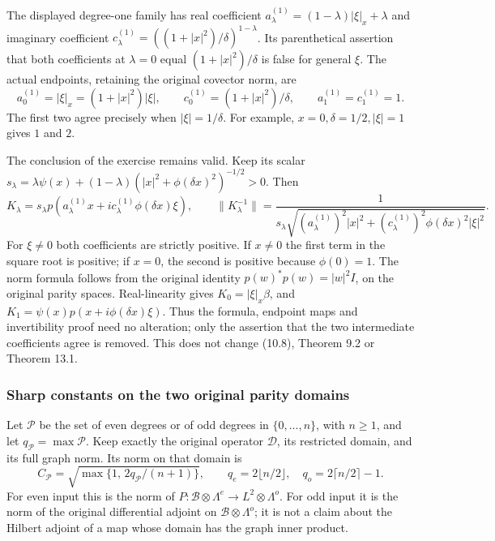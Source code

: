 \documentclass[
  11pt,
]{article}
\begin{document}
The displayed degree-one family has real coefficient
\(a_\lambda^{(1)}=(1-\lambda)|\xi|_x+\lambda\) and imaginary coefficient
\(c_\lambda^{(1)}=((1+|x|^2)/\delta)^{1-\lambda}\). Its parenthetical
assertion that both coefficients at \(\lambda=0\) equal
\((1+|x|^2)/\delta\) is false for general \(\xi\). The actual endpoints,
retaining the original covector norm, are \[
 a_0^{(1)}=|\xi|_x=(1+|x|^2)|\xi|,\qquad
 c_0^{(1)}=(1+|x|^2)/\delta,\qquad
 a_1^{(1)}=c_1^{(1)}=1 .
 \tag{BS4}
\] The first two agree precisely when \(|\xi|=1/\delta\). For example,
\(x=0,\delta=1/2,|\xi|=1\) gives \(1\) and \(2\).

The conclusion of the exercise remains valid. Keep its scalar
\(s_\lambda=\lambda\psi(x)+(1-\lambda)
(|x|^2+\phi(\delta x)^2)^{-1/2}>0\). Then \[
 K_\lambda=s_\lambda p\!\left(
       a_\lambda^{(1)}x+i c_\lambda^{(1)}\phi(\delta x)\xi\right),
 \qquad
 \|K_\lambda^{-1}\|=
 \frac{1}{s_\lambda
 \sqrt{(a_\lambda^{(1)})^2|x|^2+
       (c_\lambda^{(1)})^2\phi(\delta x)^2|\xi|^2}} .
\] For \(\xi\ne0\) both coefficients are strictly positive. If \(x\ne0\)
the first term in the square root is positive; if \(x=0\), the second is
positive because \(\phi(0)=1\). The norm formula follows from the
original identity \(p(w)^*p(w)=|w|^2I\), on the original parity spaces.
Real-linearity gives \(K_0=|\xi|_x\beta\), and \(K_1=
\psi(x)p(x+i\phi(\delta x)\xi)\). Thus the formula, endpoint maps and
invertibility proof need no alteration; only the assertion that the two
intermediate coefficients agree is removed. This does not change (10.8),
Theorem 9.2 or Theorem 13.1.

\subsubsection{Sharp constants on the two original parity
domains}\label{sharp-constants-on-the-two-original-parity-domains}

Let \(\mathcal P\) be the set of even degrees or of odd degrees in
\(\{0,\ldots,n\}\), with \(n\ge1\), and let
\(q_{\mathcal P}=\max\mathcal P\). Keep exactly the original operator
\(\mathcal D\), its restricted domain, and its full graph norm. Its norm
on that domain is \[
 C_{\mathcal P}=
 \sqrt{\max\{1,\,2q_{\mathcal P}/(n+1)\}},\qquad
 q_e=2\lfloor n/2\rfloor,\quad
 q_o=2\lceil n/2\rceil-1 .
 \tag{BS5}
\] For even input this is the norm of \(P:\mathcal B\otimes\Lambda^e
\to L^2\otimes\Lambda^o\). For odd input it is the norm of the original
differential adjoint on \(\mathcal B\otimes\Lambda^o\); it is not a
claim about the Hilbert adjoint of a map whose domain has the graph
inner product.
\end{document}

